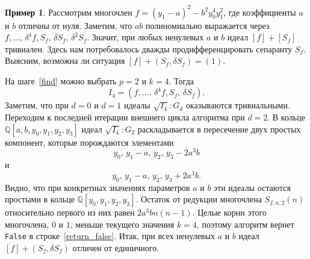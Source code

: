 \documentclass[11pt]{article}
\theoremstyle{plain1}
\theoremstyle{plain2}
\theoremstyle{plain}
\theoremstyle{plain3}
\theoremstyle{definition}
\newtheorem{example}[theorem3]{Пример}
\theoremstyle{remark}
\begin{document}
\begin{example}
Рассмотрим многочлен $f = (y_1-a)^2 - b^2 y_0^4 y_1^2$,
где коэффициенты $a$ и $b$ отличны от нуля.
Заметим, что $ab$
полиномиально выражается через $f, \ldots, \,\delta^4 f, S_f, \,\delta {S_f}, \,\delta^2 {S_f}$.
Значит, при любых ненулевых $a$ и $b$ идеал $[f] + [S_f]$ тривиален.
Здесь нам потребовалось дважды продифференцировать сепаранту $S_f$.
Выясним, возможна ли ситуация $[f] + (S_f, \delta {S_f}) = (1)$.

На шаге~\ref{find} можно выбрать $p = 2$ и $k=4$.
Тогда
$$
 I_4 = (f, \ldots, \,\delta^4 f, S_f, \,\delta {S_f}).
$$
Заметим, что при $d=0$ и $d=1$ идеалы $\sqrt{I_4}:G_d$ оказываются тривиальными.
Переходим к последней итерации внешнего цикла алгоритма при $d=2$.
В кольце $\mathbb{Q}[a,b,y_0,y_1,y_2,y_3]$
идеал $\sqrt{I_4}:G_2$ раскладывается в пересечение двух простых компонент, которые порождаются элементами
$$
 y_0, \, y_1 - a, \, y_2, \, y_3 - 2 a^3 b
$$
и
$$
 y_0, \, y_1 - a, \, y_2, \, y_3 + 2 a^3 b.
$$
Видно, что при конкретных значениях параметров $a$ и $b$
эти идеалы остаются простыми в кольце $\mathbb{Q}[y_0, y_1, y_2, y_3]$.
Остаток от редукции многочлена $S_{f,n,2}(n)$
относительно первого из них равен $2a^3 b n(n-1)$.
Целые корни этого многочлена, $0$ и $1$, меньше текущего значения $k=4$,
поэтому алгоритм вернет \verb'False' в строке~\ref{return_false}.
Итак, при всех ненулевых $a$ и $b$ идеал $[f] + (S_f, \delta {S_f})$ отличен от единичного.
\end{example}
\end{document}
